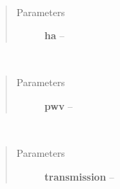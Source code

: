 \documentclass[a4paper,10pt,english]{sphinxmanual}
\begin{document}
\begin{fulllineitems}
\begin{fulllineitems}
\label{wtoapi:wtoAlgorithm.WtoAlgorithm.set_minha}~\begin{quote}\begin{description}
\item[{Parameters}] \leavevmode
\textbf{ha} -- 

\end{description}\end{quote}

\end{fulllineitems}


\begin{fulllineitems}
\label{wtoapi:wtoAlgorithm.WtoAlgorithm.set_pwv}~\begin{quote}\begin{description}
\item[{Parameters}] \leavevmode
\textbf{pwv} -- 

\end{description}\end{quote}

\end{fulllineitems}


\begin{fulllineitems}
\label{wtoapi:wtoAlgorithm.WtoAlgorithm.set_trans}~\begin{quote}\begin{description}
\item[{Parameters}] \leavevmode
\textbf{transmission} -- 

\end{description}\end{quote}

\end{fulllineitems}


\end{fulllineitems}

\end{document}
